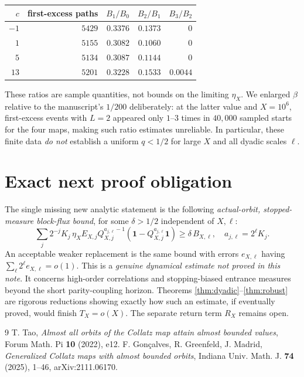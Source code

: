 \documentclass[11pt,a4paper]{article}
\theoremstyle{remark}
\newcommand{\one}{\mathbf 1}
\begin{document}
\begin{center}
\begin{tabular}{@{}rrrrr@{}}
\toprule
$c$ & first-excess paths & $B_1/B_0$ & $B_2/B_1$ & $B_3/B_2$\\
\midrule
$-1$ & $5429$ & $0.3376$ & $0.1373$ & $0$\\
$1$  & $5155$ & $0.3082$ & $0.1060$ & $0$\\
$5$  & $5134$ & $0.3087$ & $0.1144$ & $0$\\
$13$ & $5201$ & $0.3228$ & $0.1533$ & $0.0044$\\
\bottomrule
\end{tabular}
\end{center}
These ratios are sample quantities, not bounds on the limiting
$\eta_X$.  We enlarged $\beta$ relative to the manuscript's
$1/200$ deliberately: at the latter value and $X=10^6$, first-excess
events with $L=2$ appeared only $1$--$3$ times in $40{,}000$ sampled
starts for the four maps, making such ratio estimates unreliable.
In particular, these finite data \emph{do not} establish a uniform
$q<1/2$ for large $X$ and all dyadic scales $\ell$.

\section{Exact next proof obligation}
The single missing new analytic statement is the following
\emph{actual-orbit, stopped-measure block-flux bound}, for some
$\delta>1/2$ independent of $X,\ell$:
\begin{equation}\label{eq:target}
\boxed{\;
\sum_j2^{-j}K_j\,\eta_XE_{X,j}Q_{X,j}^{a_{j,\ell}-1}
       (\one-Q_{X,j}^{a_{j,\ell}}\one)
\ge\delta\,B_{X,\ell},\quad
 a_{j,\ell}=2^\ell K_j.
\;}
\end{equation}
An acceptable weaker replacement is the same bound with errors
$e_{X,\ell}$ having $\sum_\ell2^\ell e_{X,\ell}=o(1)$.
This is a \emph{genuine dynamical estimate not proved in this note}.
It concerns high-order correlations and stopping-biased entrance
measures beyond the short parity-coupling horizon.  Theorems
\ref{thm:dyadic}--\ref{thm:robust} are rigorous reductions showing
exactly how such an estimate, if eventually proved, would finish
$T_X=o(X)$.  The separate return term $R_X$ remains open.

\begin{thebibliography}{9}
 T. Tao,
\emph{Almost all orbits of the Collatz map attain almost bounded values},
Forum Math. Pi \textbf{10} (2022), e12.
 F. Gon\c{c}alves, R. Greenfeld, J. Madrid,
\emph{Generalized Collatz maps with almost bounded orbits},
Indiana Univ. Math. J. \textbf{74} (2025), 1--46,
arXiv:2111.06170.
\end{thebibliography}
\end{document}
